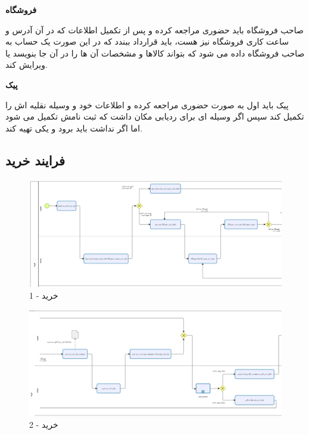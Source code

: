 \documentclass[12pt,a4paper]{article}
\begin{document}
	
	
	\textbf{فروشگاه}
	
	
	صاحب فروشگاه باید حضوری مراجعه کرده و پس از تکمیل اطلاعات که در آن آدرس و ساعت کاری فروشگاه نیز هست، باید قرارداد ببندد که در این صورت یک حساب به صاحب فروشگاه داده می شود که بتواند کالاها و مشخصات آن ها را در آن جا بنویسد یا ویرایش کند.
	
	\textbf{پیک}
	
	
	پیک باید اول به صورت حضوری مراجعه کرده و اطلاعات خود و وسیله نقلیه اش را تکمیل کند سپس اگر وسیله ای برای ردیابی مکان داشت که ثبت نامش تکمیل می شود اما اگر نداشت باید برود و یکی تهیه کند.
	\pagebreak

\subsection{فرایند خرید} \label{section.function.buy}
	\begin{figure}[h!]
		\begin{center}
			\includegraphics[width=14cm]{images/Bizagi Buy 1.png}	
		\end{center}
		\caption{خرید - 1}
	\end{figure}
	\begin{figure}[h!]
		\begin{center}
			\includegraphics[width=14cm]{images/Bizagi Buy 2.png}	
		\end{center}
		\caption{خرید - 2}
	\end{figure}
\end{document}
